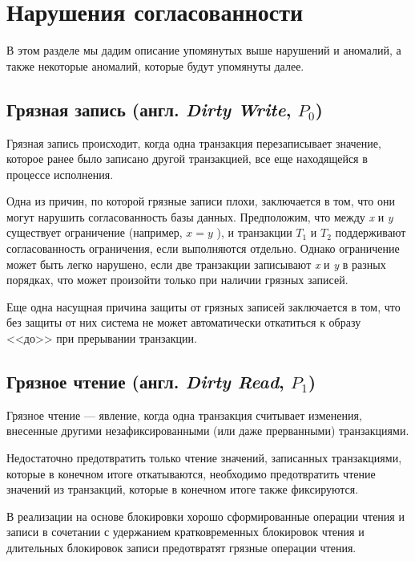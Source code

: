 \documentclass[12pt,  openany]{book}
\begin{document}
\section{Нарушения согласованности}
В этом разделе мы дадим описание упомянутых выше нарушений и аномалий, а также некоторые аномалий, которые будут упомянуты далее.

\subsection{Грязная запись (англ.  \textit{Dirty Write},  $P_0$) \cite{CritiqueANSI_SQL}}
Грязная запись происходит, когда одна транзакция перезаписывает значение, которое ранее было записано другой транзакцией, все еще находящейся в процессе исполнения.
\par
Одна из причин, по которой грязные записи плохи, заключается в том, что они могут нарушить согласованность базы данных. Предположим, что между \textit{x} и \textit{y} существует ограничение (например,  $x = y$ ), и транзакции $T_1$ и $T_2$ поддерживают согласованность ограничения, если выполняются отдельно. Однако ограничение может быть легко нарушено, если две транзакции записывают \textit{x} и \textit{y} в разных порядках, что может произойти только при наличии грязных записей.
\par
Еще одна насущная причина защиты от грязных записей заключается в том, что без защиты от них система не может автоматически откатиться к образу <<до>> при прерывании транзакции.

\subsection{Грязное чтение (англ. \textit{Dirty Read}, $P_1$)}
Грязное чтение --- явление, когда одна транзакция считывает изменения, внесенные другими незафиксированными (или даже прерванными) транзакциями. \cite{sookocheff}

\par Недостаточно предотвратить только чтение значений, записанных транзакциями, которые в конечном итоге откатываются, необходимо предотвратить чтение значений из транзакций, которые в конечном итоге также фиксируются.  \cite{CritiqueANSI_SQL}

\par В реализации на основе блокировки хорошо сформированные операции чтения и записи в сочетании с удержанием кратковременных блокировок чтения и длительных блокировок записи предотвратят грязные операции чтения.  \cite{CritiqueANSI_SQL}
\end{document}
